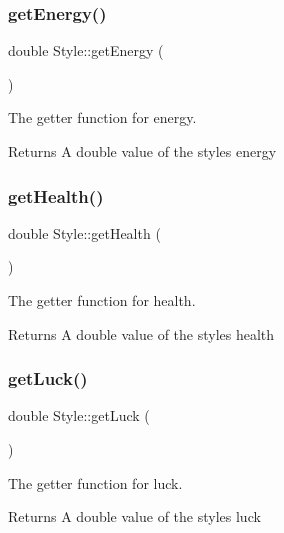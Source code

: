 \subsubsection{\texorpdfstring{getEnergy()}{getEnergy()}}
{\footnotesize\ttfamily double Style\+::get\+Energy (\begin{DoxyParamCaption}{ }\end{DoxyParamCaption})}



The getter function for energy. 

\begin{DoxyReturn}{Returns}
A double value of the style\textquotesingle{}s energy 
\end{DoxyReturn}
\mbox{\label{class_style_a104abd9500e122191f11657631066f0e}} 
\subsubsection{\texorpdfstring{getHealth()}{getHealth()}}
{\footnotesize\ttfamily double Style\+::get\+Health (\begin{DoxyParamCaption}{ }\end{DoxyParamCaption})}



The getter function for health. 

\begin{DoxyReturn}{Returns}
A double value of the style\textquotesingle{}s health 
\end{DoxyReturn}
\mbox{\label{class_style_a5ea623c07dc7358fd94b8a069ab4f8c6}} 
\subsubsection{\texorpdfstring{getLuck()}{getLuck()}}
{\footnotesize\ttfamily double Style\+::get\+Luck (\begin{DoxyParamCaption}{ }\end{DoxyParamCaption})}



The getter function for luck. 

\begin{DoxyReturn}{Returns}
A double value of the style\textquotesingle{}s luck 
\end{DoxyReturn}
\mbox{\label{class_style_abd11e168cf29373df6c331c837c098d6}} 
